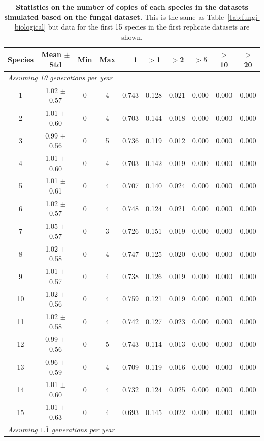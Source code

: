 \clearpage

\begin{table}[!h]
\centering
\setlength{\tabcolsep}{4pt}
\caption{{\bf Statistics on the number of copies of each species in the datasets simulated based on the fungal dataset.} This is the same as Table~\ref{tab:fungi-biological} but data for the first 15 species in the first replicate datasets are shown.}
\label{tab:fungi-simulated}
\begin{tabular}{ccccc ccccc}
\toprule
Species & Mean $\pm$ Std & Min & Max & $=$1 & $>$1 & $>$2 & $>$5 & $>$10 & $>$20\\
\midrule
\multicolumn{10}{l}{\em Assuming 10 generations per year}\\[0.5ex]
 1 & 1.02 $\pm$ 0.57 & 0 & 4 & 0.743 & 0.128 & 0.021 & 0.000 & 0.000 & 0.000\\
 2 & 1.01 $\pm$ 0.60 & 0 & 4 & 0.703 & 0.144 & 0.018 & 0.000 & 0.000 & 0.000\\
 3 & 0.99 $\pm$ 0.56 & 0 & 5 & 0.736 & 0.119 & 0.012 & 0.000 & 0.000 & 0.000\\
 4 & 1.01 $\pm$ 0.60 & 0 & 4 & 0.703 & 0.142 & 0.019 & 0.000 & 0.000 & 0.000\\
 5 & 1.01 $\pm$ 0.61 & 0 & 4 & 0.707 & 0.140 & 0.024 & 0.000 & 0.000 & 0.000\\
 6 & 1.02 $\pm$ 0.57 & 0 & 4 & 0.748 & 0.124 & 0.021 & 0.000 & 0.000 & 0.000\\
 7 & 1.05 $\pm$ 0.57 & 0 & 3 & 0.726 & 0.151 & 0.019 & 0.000 & 0.000 & 0.000\\
 8 & 1.02 $\pm$ 0.58 & 0 & 4 & 0.747 & 0.125 & 0.020 & 0.000 & 0.000 & 0.000\\
 9 & 1.01 $\pm$ 0.57 & 0 & 4 & 0.738 & 0.126 & 0.019 & 0.000 & 0.000 & 0.000\\
 10 & 1.02 $\pm$ 0.56 & 0 & 4 & 0.759 & 0.121 & 0.019 & 0.000 & 0.000 & 0.000\\
 11 & 1.02 $\pm$ 0.58 & 0 & 4 & 0.742 & 0.127 & 0.023 & 0.000 & 0.000 & 0.000\\
 12 & 0.99 $\pm$ 0.56 & 0 & 5 & 0.743 & 0.114 & 0.013 & 0.000 & 0.000 & 0.000\\
 13 & 0.96 $\pm$ 0.59 & 0 & 4 & 0.709 & 0.119 & 0.016 & 0.000 & 0.000 & 0.000\\
 14 & 1.01 $\pm$ 0.60 & 0 & 4 & 0.732 & 0.124 & 0.025 & 0.000 & 0.000 & 0.000\\
 15 & 1.01 $\pm$ 0.63 & 0 & 4 & 0.693 & 0.145 & 0.022 & 0.000 & 0.000 & 0.000\\[2ex]
 \multicolumn{10}{l}{\em Assuming $1.\bar{1}$ generations per year}\\[0.5ex]

\end{tabular}
\end{table}
